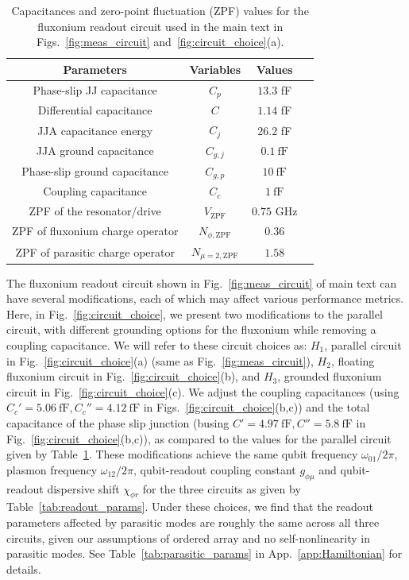 \documentclass[%
reprint,
superscriptaddress,
 amsmath,amssymb,
 aps,
 prx,
longbibliography,
floatfix,
]{revtex4-2}
\begin{document}
\begin{table}[htb]
    \begin{center}
    \begin{tabular}{|c |c| c |c| }
     \hline
     \textbf{Parameters} & \textbf{Variables} & \textbf{Values}\\ 
    \hline
    Phase-slip JJ capacitance &$C_p$ &$13.3$ fF\\ 
    \hline
    Differential capacitance &$C$ &$1.14$ fF\\ 
    \hline
    JJA capacitance energy&$C_j$&$26.2$ fF\\ 
    \hline
    JJA ground capacitance&$C_{g,j}$&$0.1 \ \mathrm{fF}$\\ 
    \hline
    Phase-slip ground capacitance&$C_{g,p}$&$10 \ \mathrm{fF}$\\ 
    \hline
    Coupling capacitance&$C_c$ &$1 \ \mathrm{fF}$\\ 
     \hline
      ZPF of the resonator/drive&$V_{\mathrm{ZPF}}$&$0.75$ GHz\\
     \hline
      ZPF of fluxonium charge operator&$N_{\phi,\mathrm{ZPF}}$&$0.36$\\
     \hline
      ZPF of parasitic charge operator&$N_{\mu=2,\mathrm{ZPF}}$&$1.58$\\
     \hline
    \end{tabular}
    \end{center}
    
    \caption{Capacitances and zero-point fluctuation (ZPF) values for the fluxonium readout circuit used in the main text in Figs.~\ref{fig:meas_circuit} and~\ref{fig:circuit_choice}(a).}
    \label{tab:params}
    \end{table}
The fluxonium readout circuit shown in Fig.~\ref{fig:meas_circuit} of main text can have several modifications, each of which may affect various performance metrics. Here, in Fig.~\ref{fig:circuit_choice}, we present two modifications to the parallel circuit, with different grounding options for the fluxonium while removing a coupling capacitance. We will refer to these circuit choices as: $H_1$, parallel circuit in Fig.~\ref{fig:circuit_choice}(a) (same as Fig.~\ref{fig:meas_circuit}), $H_2$, floating fluxonium circuit in Fig.~\ref{fig:circuit_choice}(b), and $H_3$, grounded fluxonium circuit in Fig.~\ref{fig:circuit_choice}(c). We adjust the coupling capacitances (using $C_c'=5.06 \ \mathrm{fF},C_c''=4.12 \ \mathrm{fF}$ in Figs.~\ref{fig:circuit_choice}(b,c)) and the total capacitance of the phase slip junction (busing $C'=4.97 \ \mathrm{fF},C''=5.8 \ \mathrm{fF}$ in Fig.~\ref{fig:circuit_choice}(b,c)), as compared to the values for the parallel circuit given by Table~\ref{tab:params}. These modifications achieve the same qubit frequency $\omega_{01}/2\pi$, plasmon frequency $\omega_{12}/2\pi$, qubit-readout coupling constant $g_{\phi \mu}$ and qubit-readout dispersive shift $\chi_{\phi r}$ for the three circuits as given by Table~\ref{tab:readout_params}. Under these choices, we find that the readout parameters affected by parasitic modes are roughly the same across all three circuits, given our assumptions of ordered array and no self-nonlinearity in parasitic modes. See Table~\ref{tab:parasitic_params} in App.~\ref{app:Hamiltonian} for details. 
\end{document}
